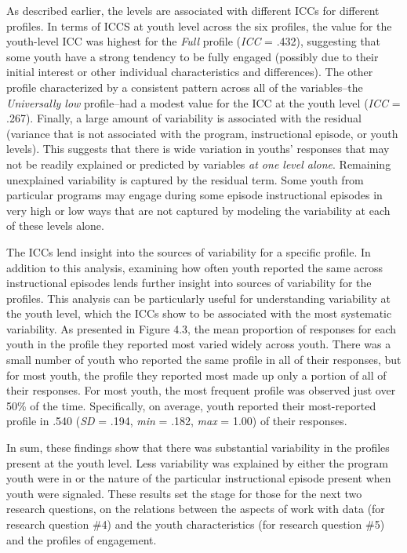 \documentclass[]{msu-thesis}
\theoremstyle{definition}
\theoremstyle{definition}
\theoremstyle{definition}
\theoremstyle{remark}
\begin{document}
As described earlier, the levels are associated with different ICCs for
different profiles. In terms of ICCS at youth level across the six
profiles, the value for the youth-level ICC was highest for the
\emph{Full} profile (\emph{ICC} = .432), suggesting that some youth have
a strong tendency to be fully engaged (possibly due to their initial
interest or other individual characteristics and differences). The other
profile characterized by a consistent pattern across all of the
variables--the \emph{Universally low} profile--had a modest value for
the ICC at the youth level (\emph{ICC} = .267). Finally, a large amount
of variability is associated with the residual (variance that is not
associated with the program, instructional episode, or youth levels).
This suggests that there is wide variation in youths' responses that may
not be readily explained or predicted by variables \emph{at one level
alone}. Remaining unexplained variability is captured by the residual
term. Some youth from particular programs may engage during some episode
instructional episodes in very high or low ways that are not captured by
modeling the variability at each of these levels alone.

The ICCs lend insight into the sources of variability for a specific
profile. In addition to this analysis, examining how often youth
reported the same across instructional episodes lends further insight
into sources of variability for the profiles. This analysis can be
particularly useful for understanding variability at the youth level,
which the ICCs show to be associated with the most systematic
variability. As presented in Figure 4.3, the mean proportion of
responses for each youth in the profile they reported most varied widely
across youth. There was a small number of youth who reported the same
profile in all of their responses, but for most youth, the profile they
reported most made up only a portion of all of their responses. For most
youth, the most frequent profile was observed just over 50\% of the
time. Specifically, on average, youth reported their most-reported
profile in .540 (\emph{SD} = .194, \emph{min} = .182, \emph{max} = 1.00)
of their responses.

In sum, these findings show that there was substantial variability in
the profiles present at the youth level. Less variability was explained
by either the program youth were in or the nature of the particular
instructional episode present when youth were signaled. These results
set the stage for those for the next two research questions, on the
relations between the aspects of work with data (for research question
\#4) and the youth characteristics (for research question \#5) and the
profiles of engagement.
\end{document}
